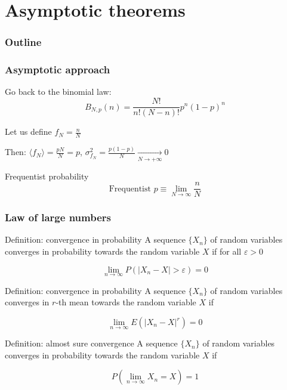 \documentclass[9pt]{beamer}
\begin{document}
\section{Asymptotic theorems}

\begin{frame}
 \frametitle{Outline}
 
 \tableofcontents[current]
\end{frame}

\begin{frame}
 \frametitle{Asymptotic approach}
 
 Go back to the binomial law: $$B_{N,p}(n) = \frac{N!}{n!(N-n)!} p^n (1-p)^n$$
 
 Let us define $f_N = \frac{n}{N}$
 
 Then: $\langle f_N \rangle = \frac{pN}{N} = p$, $\sigma^2_{f_N} = \frac{p(1-p)}{N} \xrightarrow[N \to +\infty]{} 0$
 
 \begin{block}{Frequentist probability}
  $$\text{Frequentist } p \equiv \lim_{N \to \infty} \frac{n}{N}$$
 \end{block}

\end{frame}

\begin{frame}
 \frametitle{Law of large numbers}
 
 \begin{block}{Definition: convergence in probability}
  A sequence $\{X_n\}$ of random variables converges in probability towards the random variable $X$ if for all $\varepsilon > 0$

    $$ \lim _{n\to \infty }P \left( |X_{n}-X|>\varepsilon \right)=0$$
 \end{block}
 
 \begin{block}{Definition: convergence in probability}
  A sequence $\{X_n\}$ of random variables converges in $r$-th mean towards the random variable $X$ if

    $$ \lim _{n\to \infty } E(|X_n - X|^r)=0$$
 \end{block}
 
 \begin{block}{Definition: almost sure convergence}
  A sequence $\{X_n\}$ of random variables converges in probability towards the random variable $X$ if

    $$ P\left(\lim _{n\to \infty }  X_n = X \right)=1$$
 \end{block}

\end{frame}
\end{document}

